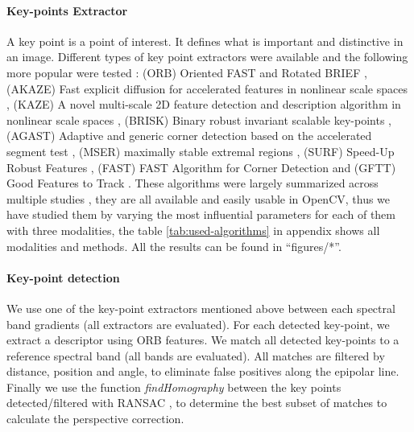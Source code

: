\documentclass[]{elsarticle}
\begin{document}
	\paragraph{Key-points Extractor}
	
	A key point is a point of interest. It defines what is important and distinctive in an image.
	Different types of key point extractors were available and the following more popular were tested :
	(ORB) Oriented FAST and Rotated BRIEF \cite{Rublee:2011:OEA:2355573.2356268}, 
	(AKAZE) Fast explicit diffusion for accelerated features in nonlinear scale spaces \cite{alcantarilla2011fast}, 
	(KAZE) A novel multi-scale 2D feature detection and description algorithm in nonlinear scale spaces \cite{rs10050756}, 
	(BRISK) Binary robust invariant scalable key-points \cite{leutenegger2011brisk}, 
	(AGAST) Adaptive and generic corner detection based on the accelerated segment test \cite{mair2010adaptive}, 
	(MSER) maximally stable extremal regions \cite{donoser2006efficient}, 
	(SURF) Speed-Up Robust Features \cite{bay2006surf}, 
	(FAST) FAST Algorithm for Corner Detection \cite{trajkovic1998fast}
	and (GFTT) Good Features to Track \cite{shi1994good}.
	These algorithms were largely summarized across multiple studies \cite{DantasDiasJunior, Tareen2018ACA, Zhang2016EXTENSIONAE, ali2016comparison},
	they are all available and easily usable in OpenCV, thus we have studied them by varying the most influential parameters for each of them with three modalities,
	the table \ref{tab:used-algorithms} in appendix shows all modalities and methods.
	All the results can be found in ``figures/*''.
	
	\paragraph{Key-point detection} \label{sec:perspective}
	We use one of the key-point extractors mentioned above between each spectral band gradients (all extractors are evaluated).
	For each detected key-point, we extract a descriptor using ORB features.
	We match all detected key-points to a reference spectral band (all bands are evaluated).
	All matches are filtered by distance, position and angle, to eliminate false positives along the epipolar line.
	Finally we use the function \textit{findHomography} between the key points detected/filtered with RANSAC \cite{Fischler:1981:RSC:358669.358692},
	to determine the best subset of matches to calculate the perspective correction.
	
	
\end{document}
